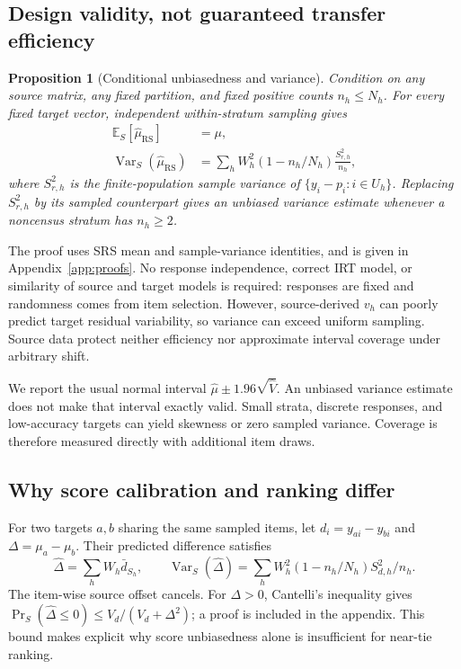 \documentclass{article}
\newtheorem{proposition}{Proposition}
\newcommand{\E}{\mathbb{E}}
\newcommand{\Var}{\operatorname{Var}}
\newcommand{\rrs}{\mathrm{RS}}
\begin{document}
\subsection{Design validity, not guaranteed transfer efficiency}
\begin{proposition}[Conditional unbiasedness and variance]
\label{prop:design}
Condition on any source matrix, any fixed partition, and fixed positive counts $n_h\leq N_h$. For every fixed target vector, independent within-stratum sampling gives
\begin{align}
\E_S[\widehat\mu_{\rrs}]&=\mu,\label{eq:unbiased}\\
\Var_S(\widehat\mu_{\rrs})&=\sum_h W_h^2(1-n_h/N_h)\frac{S_{r,h}^2}{n_h},\label{eq:variance}
\end{align}
where $S_{r,h}^2$ is the finite-population sample variance of $\{y_i-p_i:i\in U_h\}$. Replacing $S_{r,h}^2$ by its sampled counterpart gives an unbiased variance estimate whenever a noncensus stratum has $n_h\geq2$.
\end{proposition}
The proof uses SRS mean and sample-variance identities, and is given in Appendix~\ref{app:proofs}. No response independence, correct IRT model, or similarity of source and target models is required: responses are fixed and randomness comes from item selection. However, source-derived $v_h$ can poorly predict target residual variability, so variance can exceed uniform sampling. Source data protect neither efficiency nor approximate interval coverage under arbitrary shift.

We report the usual normal interval $\widehat\mu\pm1.96\sqrt{\widehat V}$. An unbiased variance estimate does not make that interval exactly valid. Small strata, discrete responses, and low-accuracy targets can yield skewness or zero sampled variance. Coverage is therefore measured directly with additional item draws.

\subsection{Why score calibration and ranking differ}
For two targets $a,b$ sharing the same sampled items, let $d_i=y_{ai}-y_{bi}$ and $\Delta=\mu_a-\mu_b$. Their predicted difference satisfies
\begin{equation}
\widehat\Delta=\sum_h W_h\bar d_{S_h},\qquad
\Var_S(\widehat\Delta)=\sum_h W_h^2(1-n_h/N_h)S_{d,h}^2/n_h.
\label{eq:pair}
\end{equation}
The item-wise source offset cancels. For $\Delta>0$, Cantelli's inequality gives $\Pr_S(\widehat\Delta\leq0)\leq V_d/(V_d+\Delta^2)$; a proof is included in the appendix. This bound makes explicit why score unbiasedness alone is insufficient for near-tie ranking.
\end{document}
